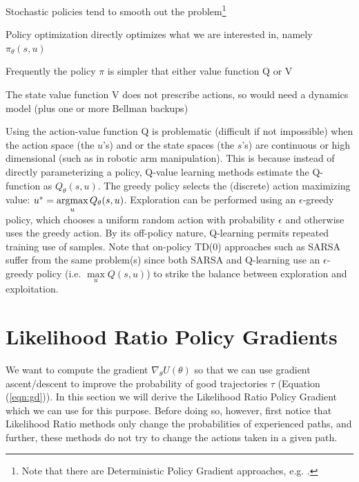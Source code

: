 \documentclass[11pt, oneside]{article}					%
\newcommand{\argmax}{\operatornamewithlimits{argmax}}
\begin{document}
\begin{itemize}
\item Stochastic policies tend to smooth out the
problem\footnote{Note that there are Deterministic Policy
Gradient approaches,
e.g. \cite{Silver:2014:DPG:3044805.3044850}.} 
\item 
{
Policy optimization directly optimizes what we are
interested in, namely $\pi_{\theta}(s,u)$ 
\item Frequently the policy $\pi$ is simpler that either value 
function Q or V
\item The state value function V does not prescribe actions, so
would need a dynamics model (plus one or more Bellman backups) 
\item Using the action-value function Q is problematic (difficult
if not impossible) when the action space (the $u$'s) and or the
state spaces (the $s$'s) are continuous or high dimensional (such
as in robotic arm manipulation). This is because instead of
directly parameterizing a policy, Q-value learning methods
estimate the Q-function as $Q_{\theta}(s, u)$. The greedy policy
selects the (discrete) action maximizing value: $u^{*}=
\argmax\limits_{u} Q_{\theta}(s, u)$. Exploration can be
performed using an $\epsilon$-greedy policy, which chooses a
uniform random action with probability $\epsilon$ and otherwise
uses the greedy action. By its off-policy nature, Q-learning
permits repeated training use of samples. Note that on-policy
TD(0) approaches such as SARSA \cite{SuttonBook} suffer from the
same problem(s) since both SARSA and Q-learning use an
$\epsilon$-greedy policy (i.e. $\max\limits_u Q(s,u)$) to strike
the balance between exploration and exploitation.
\par}
\end{itemize}

\section{Likelihood Ratio Policy Gradients}
We want to compute the gradient $\nabla_{\theta} U(\theta)$ so
that we can use gradient ascent/descent to improve the
probability of good trajectories $\tau$ (Equation
(\ref{eqn:gd})). In this section we will derive the Likelihood
Ratio Policy Gradient which we can use for this purpose.  Before
doing so, however, first notice that Likelihood Ratio methods
only change the probabilities of experienced paths, and further,
these methods do not try to change the actions taken in a given
path.
\end{document}
